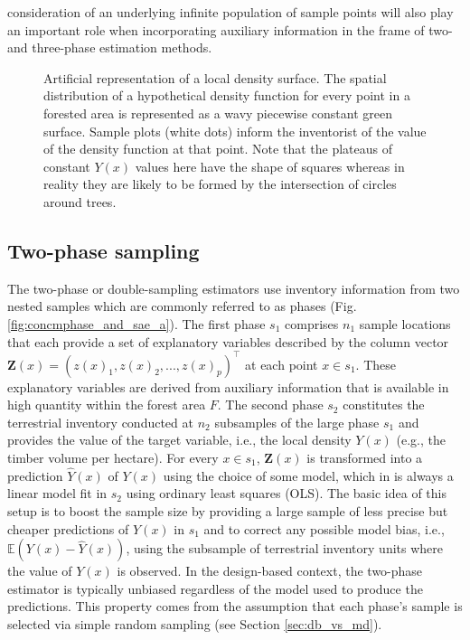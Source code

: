 \documentclass[article]{jss}
\newcommand{\EX}{\mathbb{E}}
\begin{document}
consideration of an underlying infinite population of sample points will also play an important role when incorporating auxiliary information in the frame of two- and three-phase estimation methods.

\begin{figure}[htb]
\centering
{}
\caption{Artificial representation of a local density surface. The spatial distribution of a hypothetical density function for every point in a forested area is represented as a wavy piecewise constant green surface.  Sample plots (white dots) inform the inventorist of the value of the density function at that point. Note that the plateaus of constant $Y(x)$ values here have the shape of squares whereas in reality they are likely to be formed by the intersection of circles around trees.}
\label{fig:inf_pop_apr}
\end{figure}


\subsection{Two-phase sampling}

The two-phase or double-sampling estimators use inventory information from two nested samples which are commonly referred to as phases (Fig. \ref{fig:concmphase_and_sae_a}). The first phase $s_1$ comprises $n_1$ sample locations that each provide a set of explanatory variables described by the column vector $\pmb{Z}(x)=(z(x)_1, z(x)_2,...,z(x)_p)^{\top}$ at each point $x \in s_1$. These explanatory variables are derived from auxiliary information that is available in high quantity within the forest area $F$. The second phase $s_2$ constitutes the terrestrial inventory conducted at $n_2$ subsamples of the large phase $s_1$ and provides the value of the target variable, i.e., the local density $Y(x)$ (e.g., the timber volume per hectare). For every $x \in s_1$, $\pmb{Z}(x)$ is transformed into a prediction $\hat{Y}(x)$ of $Y(x)$ using the choice of some model, which in  is always a linear model fit in $s_2$ using ordinary least squares (OLS). The basic idea of this setup is to boost the sample size by providing a large sample of less precise but cheaper predictions of $Y(x)$ in $s_1$ and to correct any possible model bias, i.e., $\EX{(Y(x)-\hat{Y}(x))}$, using the subsample of terrestrial inventory units where the value of $Y(x)$ is observed. In the design-based context, the two-phase estimator is typically unbiased regardless of the model used to produce the predictions. This property comes from the assumption that each phase's sample is selected via simple random sampling (see Section \ref{sec:db_vs_md}).
\end{document}
